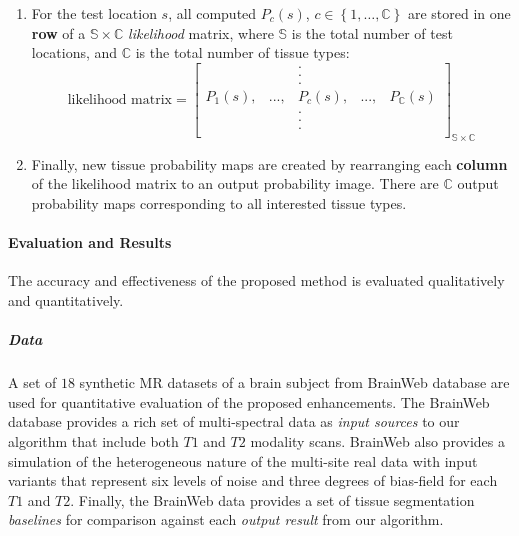 \begin{enumerate}
\item For the test location $s$, all computed $P_c(s)$, $c\in \left\{1,\ldots, \mathbb{C}\right\}$ are stored in one \textbf{row} of a $\mathbb{S}\times \mathbb{C}$ \textit{likelihood} matrix, where $\mathbb{S}$ is the total number of test locations, and $\mathbb{C}$ is the total number of tissue types:
\begin{equation}
\textrm{likelihood matrix} =
\begin{bmatrix}
 & & . \\
 & & . \\
 & & . \\
P_1(s), & ..., & P_c(s), & ..., & P_{\mathbb{C}}(s) \\
 & & . \\
 & & . \\
 & & . \\
\end{bmatrix}_{\mathbb{S}\times \mathbb{C}}
\end{equation}

\item Finally, new tissue probability maps are created by rearranging each \textbf{column} of the likelihood matrix to an output probability image. There are $\mathbb{C}$ output probability maps corresponding to all interested tissue types.
\end{enumerate}

\paragraph{Evaluation and Results} %

The accuracy and effectiveness of the proposed method is evaluated qualitatively and quantitatively.

\subparagraph{Data} %
\label{brainWebData}

A set of $18$ synthetic MR datasets of a brain subject from BrainWeb database \cite{Cocosco1997} are used for quantitative evaluation of the proposed enhancements.
The BrainWeb database provides a rich set of multi-spectral data as \textit{input sources} to our algorithm that include both $T1$ and $T2$ modality scans. BrainWeb also provides a simulation of the heterogeneous nature of the multi-site real data with input variants that represent six levels of noise and three degrees of bias-field for each $T1$ and $T2$. 
Finally, the BrainWeb data provides a set of tissue segmentation \textit{baselines} for comparison against each \textit{output result} from our algorithm.


